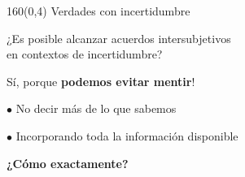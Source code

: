 \documentclass[shownotes,aspectratio=169]{beamer}
\begin{document}
\begin{frame}[plain]
\begin{textblock}{160}(0,4) \centering
\LARGE Verdades con incertidumbre \\
\Large {}
\end{textblock}
\vspace{2cm}

\Large \centering

¿Es posible alcanzar acuerdos intersubjetivos \\ en contextos de incertidumbre?

\vspace{1cm} \large

\pause

Sí, porque \textbf{podemos evitar mentir}!

\vspace{0.2cm} \pause

$\bullet$ No decir más de lo que sabemos

$\bullet$ Incorporando toda la información disponible

\pause \centering \vspace{1cm}

\textbf{¿Cómo exactamente?}


\end{frame}
\end{document}
